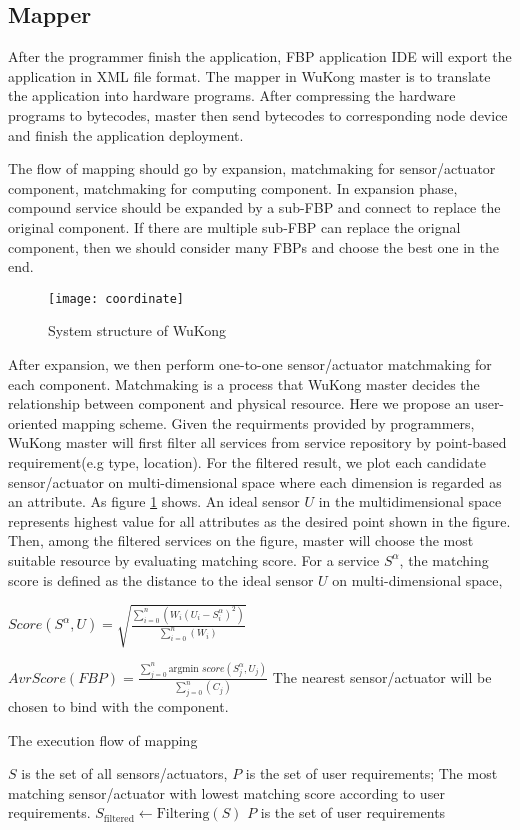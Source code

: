 \subsection{Mapper}

After the programmer finish the application, FBP application IDE will export the application in XML file format. The mapper in WuKong master is to translate the application into hardware programs. After compressing the hardware programs to bytecodes, master then send bytecodes to corresponding node device and finish the application deployment. 

The flow of mapping should go by expansion, matchmaking for sensor/actuator component, matchmaking for computing component. In expansion phase, compound service should be expanded by a sub-FBP and connect to replace the original component. If there are multiple sub-FBP can replace the orignal component, then we should consider many FBPs and choose the best one in the end. 

\begin{figure}[!t]
\centering
\texttt{[image: coordinate]}
\caption{System structure of WuKong}
\label{fig:multidimensional}
\end{figure}

After expansion, we then perform one-to-one sensor/actuator matchmaking for each component. Matchmaking is a process that WuKong master decides the relationship between component and physical resource. Here we propose an user-oriented mapping scheme. Given the requirments provided by programmers, WuKong master will first filter all services from service repository by point-based requirement(e.g type, location). For the filtered result, we plot each candidate sensor/actuator on multi-dimensional space where each dimension is regarded as an attribute. As figure \ref{fig:multidimensional} shows. 
An ideal sensor $U$ in the multidimensional space represents highest value for all attributes as the desired point shown in the figure. Then, among the filtered services on the figure, master will choose the most suitable resource by evaluating matching score. For a service $S^\alpha$, the matching score is defined as the distance to the ideal sensor $U$ on multi-dimensional space, 

$Score(S^\alpha, U) = \sqrt{ \frac{\sum\limits_{i=0}^n(W_i(U_i - S_i^\alpha)^2)}{\sum\limits_{i=0}^n(W_i)}}$


$AvrScore(FBP) = \frac{\sum\limits_{j=0}^n \text{argmin } score(S_j^\alpha, U_j)}{\sum\limits_{j=0}^n(C_j)}$
The nearest sensor/actuator will be chosen to bind with the component.
\begin{algorithm}[h]
    \caption{The execution flow of mapping}
    \begin{algorithmic}[1]
        \REQUIRE $S$ is the set of all sensors/actuators, $P$ is the set of user requirements;
        \ENSURE The most matching sensor/actuator with lowest matching score according to user requirements. 
        \STATE $S_{\text{filtered}} \leftarrow \text{Filtering}(S)$
        \STATE $P$ is the set of user requirements  
          
    \end{algorithmic}
\end{algorithm}